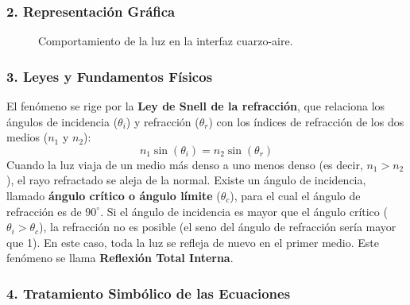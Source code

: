 \subsubsection*{2. Representación Gráfica}
\begin{figure}[H]
    \centering
    \caption{Comportamiento de la luz en la interfaz cuarzo-aire.}
\end{figure}

\subsubsection*{3. Leyes y Fundamentos Físicos}
El fenómeno se rige por la \textbf{Ley de Snell de la refracción}, que relaciona los ángulos de incidencia ($\theta_i$) y refracción ($\theta_r$) con los índices de refracción de los dos medios ($n_1$ y $n_2$):
$$ n_1 \sin(\theta_i) = n_2 \sin(\theta_r) $$
Cuando la luz viaja de un medio más denso a uno menos denso (es decir, $n_1 > n_2$), el rayo refractado se aleja de la normal. Existe un ángulo de incidencia, llamado \textbf{ángulo crítico o ángulo límite} ($\theta_c$), para el cual el ángulo de refracción es de $90^\circ$.
Si el ángulo de incidencia es mayor que el ángulo crítico ($\theta_i > \theta_c$), la refracción no es posible (el seno del ángulo de refracción sería mayor que 1). En este caso, toda la luz se refleja de nuevo en el primer medio. Este fenómeno se llama \textbf{Reflexión Total Interna}.

\subsubsection*{4. Tratamiento Simbólico de las Ecuaciones}
